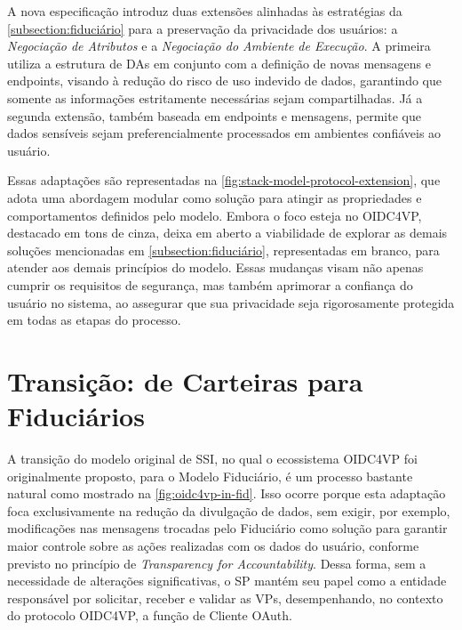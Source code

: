 
A nova especificação introduz duas extensões alinhadas às estratégias da \autoref{subsection:fiduciário} para a preservação da privacidade dos usuários: a \emph{Negociação de Atributos} e a \emph{Negociação do Ambiente de Execução}. A primeira utiliza a estrutura de \acs{DA}s em conjunto com a definição de novas mensagens e endpoints, visando à redução do risco de uso indevido de dados, garantindo que somente as informações estritamente necessárias sejam compartilhadas. Já a segunda extensão, também baseada em endpoints e mensagens, permite que dados sensíveis sejam preferencialmente processados em ambientes confiáveis ao usuário.

Essas adaptações são representadas na \autoref{fig:stack-model-protocol-extension}, que adota uma abordagem modular como solução para atingir as propriedades e comportamentos definidos pelo modelo. Embora o foco esteja no \acs{OIDC4VP}, destacado em tons de cinza, deixa em aberto a viabilidade de explorar as demais soluções mencionadas em \autoref{subsection:fiduciário}, representadas em branco, para atender aos demais princípios do modelo.
Essas mudanças visam não apenas cumprir os requisitos de segurança, mas também aprimorar a confiança do usuário no sistema, ao assegurar que sua privacidade seja rigorosamente protegida em todas as etapas do processo.



\section{Transição: de Carteiras para Fiduciários}

A transição do modelo original de \acs{SSI}, no qual o ecossistema \acs{OIDC4VP} foi originalmente proposto, para o Modelo Fiduciário, é um processo bastante natural como mostrado na \autoref{fig:oidc4vp-in-fid}. 
Isso ocorre porque esta adaptação foca exclusivamente na redução da divulgação de dados, sem exigir, por exemplo, modificações nas mensagens trocadas pelo Fiduciário como solução para garantir maior controle sobre as ações realizadas com os dados do usuário, conforme previsto no princípio de \emph{Transparency for Accountability}.
Dessa forma, sem a necessidade de alterações significativas, o \acs{SP} mantém seu papel como a entidade responsável por solicitar, receber e validar as \acs{VP}s, desempenhando, no contexto do protocolo \acs{OIDC4VP}, a função de Cliente OAuth.

